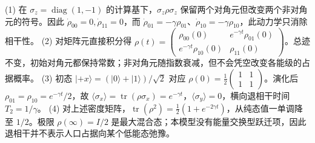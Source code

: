 (1) 在 \(\sigma_z=\operatorname{diag}(1,-1)\) 的计算基下，\(\sigma_z\rho\sigma_z\) 保留两个对角元但改变两个非对角元的符号。因此 \(\dot\rho_{00}=0,\dot\rho_{11}=0\)，而 \(\dot\rho_{01}=-\gamma\rho_{01}\)、\(\dot\rho_{10}=-\gamma\rho_{10}\)，此动力学只消除相干性。
(2) 对矩阵元直接积分得 \(\rho(t)=\begin{pmatrix}\rho_{00}(0)&e^{-\gamma t}\rho_{01}(0)\\e^{-\gamma t}\rho_{10}(0)&\rho_{11}(0)\end{pmatrix}\)。总迹不变，初始对角元都保持常数；非对角元随指数衰减，但不会凭空改变各能级的占据概率。
(3) 初态 \(|+x\rangle=(|0\rangle+|1\rangle)/\sqrt2\) 对应 \(\rho(0)=\frac12\begin{pmatrix}1&1\\1&1\end{pmatrix}\)。演化后 \(\rho_{01}=\rho_{10}=e^{-\gamma t}/2\)，故 \(\langle\sigma_x\rangle=\operatorname{tr}(\rho\sigma_x)=e^{-\gamma t}\)，\(\langle\sigma_y\rangle=0\)，横向退相干时间 \(T_2=1/\gamma\)。
(4) 对上述密度矩阵，\(\operatorname{tr}(\rho^2)=\frac12(1+e^{-2\gamma t})\)，从纯态值一单调降至 \(1/2\)。极限 \(\rho(\infty)=I/2\) 是最大混合态；本模型没有能量交换型跃迁项，因此退相干并不表示人口占据向某个低能态弛豫。
